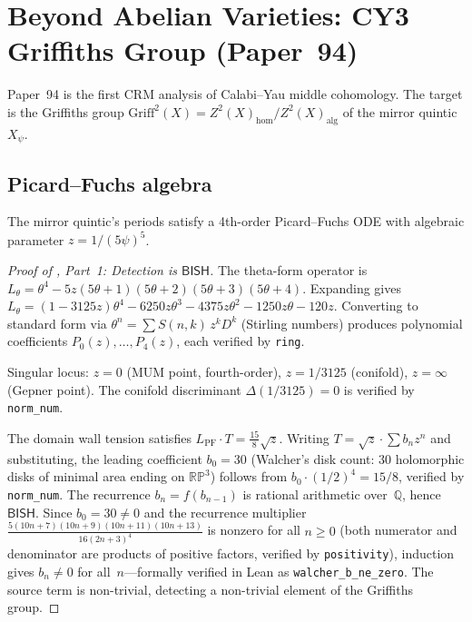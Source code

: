 \documentclass[11pt]{article}
\theoremstyle{plain}
\theoremstyle{definition}
\theoremstyle{remark}
\newcommand{\QQ}{\mathbb{Q}}
\newcommand{\RR}{\mathbb{R}}
\newcommand{\BISH}{\mathsf{BISH}}
\begin{document}
\section{Beyond Abelian Varieties: CY3 Griffiths Group
  (Paper~94)}\label{sec:cy3}

Paper~94 \cite{p94} is the first CRM analysis of Calabi--Yau
middle cohomology.  The target is the Griffiths group
$\mathrm{Griff}^2(X) = Z^2(X)_{\mathrm{hom}} / Z^2(X)_{\mathrm{alg}}$
of the mirror quintic $X_\psi$.

\subsection{Picard--Fuchs algebra}

The mirror quintic's periods satisfy a 4th-order Picard--Fuchs ODE with
algebraic parameter $z = 1/(5\psi)^5$.

\begin{proof}[Proof of , Part~1: Detection is $\BISH$]
The theta-form operator is $L_\theta = \theta^4 - 5z(5\theta+1)(5\theta+2)(5\theta+3)(5\theta+4)$.  Expanding gives $L_\theta = (1 - 3125z)\theta^4 - 6250z\theta^3 - 4375z\theta^2 - 1250z\theta - 120z$.  Converting to standard form via $\theta^n = \sum S(n,k)\,z^k D^k$ (Stirling numbers) produces polynomial coefficients $P_0(z), \ldots, P_4(z)$, each verified by \texttt{ring}.

Singular locus: $z = 0$ (MUM point, fourth-order), $z = 1/3125$ (conifold), $z = \infty$ (Gepner point).  The conifold discriminant $\Delta(1/3125) = 0$ is verified by \texttt{norm\_num}.

The domain wall tension satisfies $L_{\mathrm{PF}} \cdot T = \tfrac{15}{8}\sqrt{z}$.  Writing $T = \sqrt{z} \cdot \sum b_n z^n$ and substituting, the leading coefficient $b_0 = 30$ (Walcher's disk count: 30 holomorphic disks of minimal area ending on $\RR\mathbb{P}^3$) follows from $b_0 \cdot (1/2)^4 = 15/8$, verified by \texttt{norm\_num}.  The recurrence $b_n = f(b_{n-1})$ is rational arithmetic over~$\QQ$, hence $\BISH$.  Since $b_0 = 30 \neq 0$ and the recurrence multiplier $\frac{5(10n+7)(10n+9)(10n+11)(10n+13)}{16(2n+3)^4}$ is nonzero for all $n \geq 0$ (both numerator and denominator are products of positive factors, verified by \texttt{positivity}), induction gives $b_n \neq 0$ for all~$n$---formally verified in Lean as \texttt{walcher\_b\_ne\_zero}.  The source term is non-trivial, detecting a non-trivial element of the Griffiths group.
\end{proof}
\end{document}
